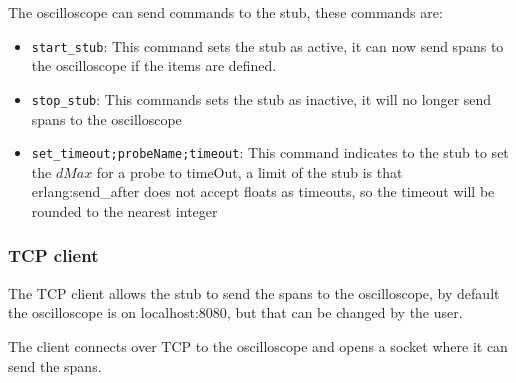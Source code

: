             The oscilloscope can send commands to the stub, these commands are:
            \begin{itemize}
                \item \texttt{start\_stub}: This command sets the stub as active, it can now send spans to the oscilloscope if the items are defined.
                \item \texttt{stop\_stub}: This commands sets the stub as inactive, it will no longer send spans to the oscilloscope
                \item \texttt{set\_timeout;probeName;timeout}: This command indicates to the stub to set the $dMax$ for a probe to timeOut, a limit of the stub is that erlang:send\_after does not accept floats as timeouts, so the timeout will be rounded to the nearest integer
            \end{itemize}

        \subsubsection{TCP client}
            The TCP client allows the stub to send the spans to the oscilloscope, by default the oscilloscope is on localhost:8080, but that can be changed by the user.

            The client connects over TCP to the oscilloscope and opens a socket where it can send the spans.
